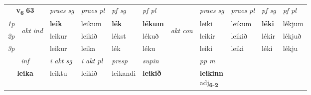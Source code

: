 \noindent
\begin{tabular}{lllllllllll} \toprule
\multicolumn{2}{c}{\textbf{v{\textsubscript{6}}} \Large{\textbf{63}}}  &  \textit{praes sg}  & \textit{praes pl}  &\textit{ pf sg} & \textit{pf pl} &  &  \textit{praes sg}  & \textit{praes pl}  & \textit{pf sg} & \textit{pf pl } \\*
	\cmidrule{3-6} \cmidrule{8-11}
 {\textit{1p}} & \multirow{3}{*}{\begin{turn}{90}\textit{akt ind}\end{turn}} & \textbf{leik} & leikum & \textbf{lék} & \textbf{lékum} & \multirow{3}{*}{\begin{turn}{90}\textit{akt con}\end{turn}} &leiki & leikum & \textbf{léki} & lékjum\\*
 {\textit{2p}} &  &  leikur  & leikið & lékst & lékuð & & leikir & leikið & lékir & lékjuð \\*
{\textit{3p}} &  & leikur & leika & lék & léku & & leiki & leiki& léki & lékju \\*
\cmidrule{3-6} \cmidrule{8-11}

   \multicolumn{2}{c}{\textit{inf}}  & \textit{i akt sg} & \textit{i akt pl}   & \textit{presp} & \textit{supin}  && \textit{pp m} \\*
  \multicolumn{2}{c}{\textbf{leika}} & leiktu  & leikið   & leikandi &  \textbf{leikið}  && \specialcell{\textbf{leikinn} \\ adj\textbf{\textsubscript{6-2}}} \\*
\end{tabular}

